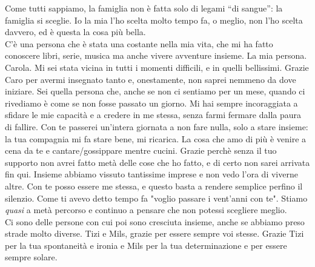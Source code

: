 \begin{acknowledgments}
Come tutti sappiamo, la famiglia non è fatta solo di legami “di sangue”: la famiglia si sceglie. Io la mia l’ho scelta molto tempo fa, o meglio, non l’ho scelta davvero, ed è questa la cosa più bella.\\
C'è una persona che è stata una costante nella mia vita, che mi ha fatto conoscere libri, serie, musica ma anche vivere avventure insieme. La mia persona. Carola. Mi sei stata vicina in tutti i momenti difficili, e in quelli bellissimi. Grazie Caro per avermi insegnato tanto e, onestamente, non saprei nemmeno da dove iniziare. Sei quella persona che, anche se non ci sentiamo per un mese, quando ci rivediamo è come se non fosse passato un giorno. Mi hai sempre incoraggiata a sfidare le mie capacità e a credere in me stessa, senza farmi fermare dalla paura di fallire. Con te passerei un'intera giornata a non fare nulla, solo a stare insieme: la tua compagnia mi fa stare bene, mi ricarica. La cosa che amo di più è venire a cena da te e cantare/gossippare mentre cucini. Grazie perchè senza il tuo supporto non avrei fatto metà delle cose che ho fatto, e di certo non sarei arrivata fin qui. Insieme abbiamo vissuto tantissime imprese e non vedo l'ora di viverne altre. Con te posso essere me stessa, e questo basta a rendere semplice perfino il silenzio. Come ti avevo detto tempo fa "voglio passare i vent'anni con te". Stiamo \textit{quasi} a metà percorso e continuo a pensare che non potessi scegliere meglio.\\

Ci sono delle persone con cui poi sono cresciuta insieme, anche se abbiamo preso strade molto diverse. Tizi e Mils, grazie per essere sempre voi stesse. Grazie Tizi per la tua spontaneità e ironia e Mils per la tua determinazione e per essere sempre solare. \\


\end{acknowledgments}
